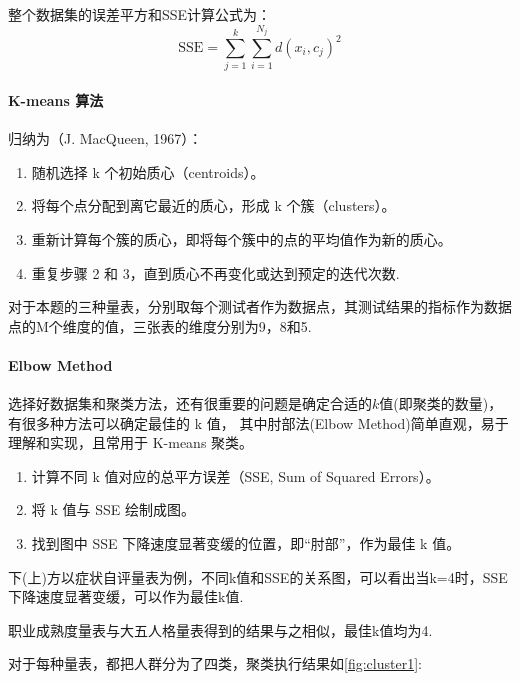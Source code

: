 \documentclass[withoutpreface,bwprint]{cumcmthesis} %
\begin{document}
整个数据集的误差平方和SSE计算公式为：
\begin{equation}
    \text{SSE} = \sum_{j=1}^k \sum_{i=1}^{N_j} d(x_i, c_j)^2
    \label{eq:SSE}
\end{equation}
    

\paragraph*{K-means 算法}归纳为（J. MacQueen, 1967）\cite{k-means}：
\begin{enumerate}
    \item 随机选择 k 个初始质心（centroids）。
    
    \item 将每个点分配到离它最近的质心，形成 k 个簇（clusters）。
    
    \item 重新计算每个簇的质心，即将每个簇中的点的平均值作为新的质心。
    
    \item 重复步骤 2 和 3，直到质心不再变化或达到预定的迭代次数.

\end{enumerate}

对于本题的三种量表，分别取每个测试者作为数据点，其测试结果的指标作为数据点的M个维度的值，三张表的维度分别为9，8和5.


\paragraph*{Elbow Method}选择好数据集和聚类方法，还有很重要的问题是确定合适的$k$值(即聚类的数量)，
有很多种方法可以确定最佳的 k 值， 其中肘部法(Elbow Method)简单直观，易于理解和实现，且常用于 K-means 聚类。
\begin{enumerate}
    \item 计算不同 k 值对应的总平方误差（SSE, Sum of Squared Errors）。
    
    \item 将 k 值与 SSE 绘制成图。

    \item 找到图中 SSE 下降速度显著变缓的位置，即“肘部”，作为最佳 k 值。

\end{enumerate}
下(上)方以症状自评量表为例，不同k值和SSE的关系图，可以看出当k=4时，SSE下降速度显著变缓，可以作为最佳k值.

职业成熟度量表与大五人格量表得到的结果与之相似，最佳k值均为4.

对于每种量表，都把人群分为了四类，聚类执行结果如\cref{fig:cluster1}:
\end{document}
